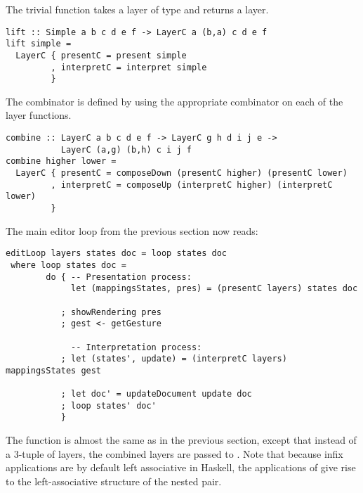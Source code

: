 \documentclass[preprint,natbib]{sigplanconf}
\begin{document}
The trivial function  takes a layer of type  and returns a  layer.

\begin{small}
\begin{verbatim}
lift :: Simple a b c d e f -> LayerC a (b,a) c d e f
lift simple = 
  LayerC { presentC = present simple
         , interpretC = interpret simple
         }
\end{verbatim}
\end{small}

The  combinator is defined by using the appropriate  combinator on each of the layer functions. 

\begin{small}
\begin{verbatim}
combine :: LayerC a b c d e f -> LayerC g h d i j e -> 
           LayerC (a,g) (b,h) c i j f
combine higher lower =
  LayerC { presentC = composeDown (presentC higher) (presentC lower)
         , interpretC = composeUp (interpretC higher) (interpretC lower)
         }
\end{verbatim}
\end{small}



The main editor loop from the previous section now reads:
 
 \begin{small}
 \begin{verbatim}
editLoop layers states doc = loop states doc
 where loop states doc = 
        do { -- Presentation process:
             let (mappingsStates, pres) = (presentC layers) states doc
           
           ; showRendering pres
           ; gest <- getGesture
 
             -- Interpretation process:
           ; let (states', update) = (interpretC layers) mappingsStates gest
       
           ; let doc' = updateDocument update doc
           ; loop states' doc'
           }
\end{verbatim}
\end{small}

The  function is almost the same as in the previous section, except that instead of a 3-tuple of layers, the combined layers are passed to . Note that because infix applications are by default left associative in Haskell, the applications of  give rise to the left-associative structure of the nested pair.
\end{document}
